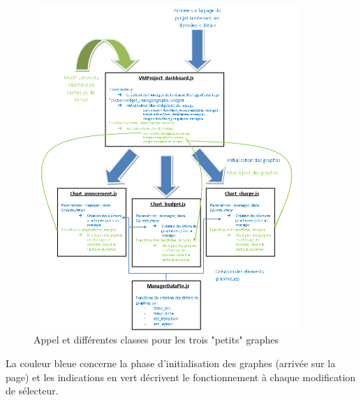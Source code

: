 \documentclass[12pt]{report}
\begin{document}
\begin{appendices}
	\begin{figure}[H]
	\centering
	\includegraphics[width=0.9\textwidth]{pictures/clement/c3.png}
	\caption{Appel et différentes classes pour les trois "petits" graphes}
	\label{c3}
\end{figure}
La couleur bleue concerne la phase d’initialisation des graphes (arrivée sur la page) et les indications en vert décrivent le fonctionnement à chaque modification de sélecteur. \\
\end{appendices}
\end{document}
